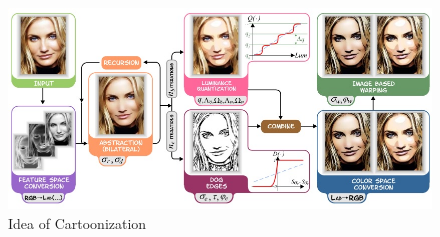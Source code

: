 \documentclass[conference]{IEEEtran}
\begin{document}
\begin{figure}
 	\includegraphics[width = \linewidth]{Idea.jpg}
 	\caption{Idea of Cartoonization}
 	\label{fig:Idea}
 \end{figure}
 
\end{document}
